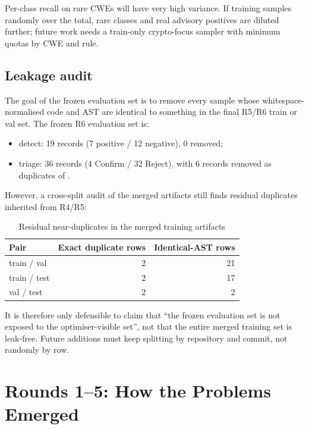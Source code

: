 \documentclass[11pt]{article}
\newcommand{\code}[1]{\texttt{\detokenize{#1}}}
\begin{document}
Per-class recall on rare CWEs will have very high variance. If training samples randomly over the total, rare
classes and real advisory positives are diluted further; future work needs a train-only crypto-focus sampler
with minimum quotas by CWE and rule.

\subsection{Leakage audit}

The goal of the frozen evaluation set is to remove every sample whose whitespace-normalised code and AST are
identical to something in the final R5/R6 train or val set. The frozen R6 evaluation set is:

\begin{itemize}
  \item detect: 19 records (7 positive / 12 negative), 0 removed;
  \item triage: 36 records (4 Confirm / 32 Reject), with 6 records removed as duplicates of
        \code{round4-real-passlib}.
\end{itemize}

However, a cross-split audit of the merged artifacts still finds residual duplicates inherited from R4/R5:

\begin{table}[h]
\centering
\caption{Residual near-duplicates in the merged training artifacts}
\label{tab:leakage-en}
\small
\begin{tabular}{lrr}
\toprule
\textbf{Pair} & \textbf{Exact duplicate rows} & \textbf{Identical-AST rows} \\
\midrule
train / val & 2 & 21 \\
train / test & 2 & 17 \\
val / test & 2 & 2 \\
\bottomrule
\end{tabular}
\end{table}

It is therefore only defensible to claim that ``the frozen evaluation set is not exposed to the optimiser-visible
set'', not that the entire merged training set is leak-free. Future additions must keep splitting by repository
and commit, not randomly by row.

\section{Rounds 1--5: How the Problems Emerged}
\end{document}
